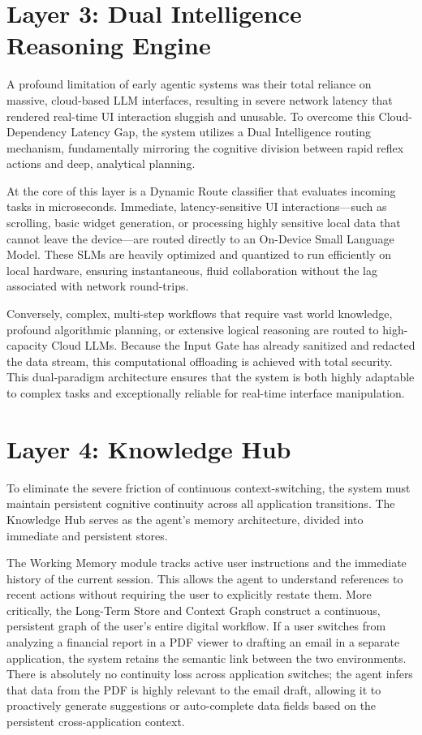 \documentclass[12pt, a4paper]{report}
\begin{document}
\section{Layer 3: Dual Intelligence Reasoning Engine}
A profound limitation of early agentic systems was their total reliance on massive, cloud-based LLM interfaces, resulting in severe network latency that rendered real-time UI interaction sluggish and unusable.\cite{hojo2025} To overcome this Cloud-Dependency Latency Gap, the system utilizes a Dual Intelligence routing mechanism, fundamentally mirroring the cognitive division between rapid reflex actions and deep, analytical planning.\cite{hojo2025}

At the core of this layer is a Dynamic Route classifier that evaluates incoming tasks in microseconds. Immediate, latency-sensitive UI interactions—such as scrolling, basic widget generation, or processing highly sensitive local data that cannot leave the device—are routed directly to an On-Device Small Language Model.\cite{hojo2025} These SLMs are heavily optimized and quantized to run efficiently on local hardware, ensuring instantaneous, fluid collaboration without the lag associated with network round-trips.

Conversely, complex, multi-step workflows that require vast world knowledge, profound algorithmic planning, or extensive logical reasoning are routed to high-capacity Cloud LLMs.\cite{hojo2025} Because the Input Gate has already sanitized and redacted the data stream, this computational offloading is achieved with total security. This dual-paradigm architecture ensures that the system is both highly adaptable to complex tasks and exceptionally reliable for real-time interface manipulation.

\section{Layer 4: Knowledge Hub}
To eliminate the severe friction of continuous context-switching, the system must maintain persistent cognitive continuity across all application transitions.\cite{hojo2025} The Knowledge Hub serves as the agent's memory architecture, divided into immediate and persistent stores.

The Working Memory module tracks active user instructions and the immediate history of the current session.\cite{hojo2025} This allows the agent to understand references to recent actions without requiring the user to explicitly restate them. More critically, the Long-Term Store and Context Graph construct a continuous, persistent graph of the user's entire digital workflow.\cite{hojo2025} If a user switches from analyzing a financial report in a PDF viewer to drafting an email in a separate application, the system retains the semantic link between the two environments. There is absolutely no continuity loss across application switches; the agent infers that data from the PDF is highly relevant to the email draft, allowing it to proactively generate suggestions or auto-complete data fields based on the persistent cross-application context.\cite{hojo2025}
\end{document}
